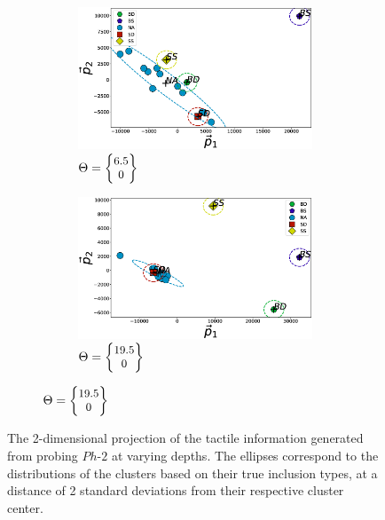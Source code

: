 \begin{figure}[]
	\begin{subfigure}[b]{\textwidth}
		\begin{subfigure}[b]{.48\textwidth}
			\includegraphics[width=\textwidth]{./figs/phantom1properties_clsplt_Vertical-d6_5.eps}
			\caption{$\Theta = \small{\begin{Bmatrix}6.5\\ 0\end{Bmatrix}}$}
			\label{ResVert:dn0}
		\end{subfigure} 
		\hspace{0.01\textwidth}
		\begin{subfigure}[b]{0.48\textwidth}
			\includegraphics[width=\textwidth]{./figs/phantom1properties_clsplt_Vertical-d19_5.eps}
			\caption{$\Theta = \small{\begin{Bmatrix}19.5\\ 0\end{Bmatrix}}$}
			\label{ResVert:dn9}
		\end{subfigure}
	\end{subfigure}
	\caption{The 2-dimensional projection of the tactile information generated from probing $Ph\text{-}2$ 
		at varying depths. The ellipses correspond to the distributions of the clusters based on their true 
		inclusion types, at a distance of 2 standard deviations from their respective cluster center.}
	\label{ResVert}
\end{figure}

